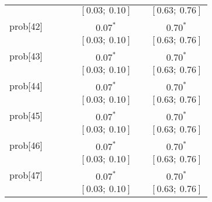 \begin{table}
\begin{center}
\begin{tabular}{l c c c c c c }
          &                           &                           &                           & $[0.03;\ 0.10]$         &                           & $[0.63;\ 0.76]$       \\
prob[42]  &                           &                           &                           & $0.07^{*}$              &                           & $0.70^{*}$            \\
          &                           &                           &                           & $[0.03;\ 0.10]$         &                           & $[0.63;\ 0.76]$       \\
prob[43]  &                           &                           &                           & $0.07^{*}$              &                           & $0.70^{*}$            \\
          &                           &                           &                           & $[0.03;\ 0.10]$         &                           & $[0.63;\ 0.76]$       \\
prob[44]  &                           &                           &                           & $0.07^{*}$              &                           & $0.70^{*}$            \\
          &                           &                           &                           & $[0.03;\ 0.10]$         &                           & $[0.63;\ 0.76]$       \\
prob[45]  &                           &                           &                           & $0.07^{*}$              &                           & $0.70^{*}$            \\
          &                           &                           &                           & $[0.03;\ 0.10]$         &                           & $[0.63;\ 0.76]$       \\
prob[46]  &                           &                           &                           & $0.07^{*}$              &                           & $0.70^{*}$            \\
          &                           &                           &                           & $[0.03;\ 0.10]$         &                           & $[0.63;\ 0.76]$       \\
prob[47]  &                           &                           &                           & $0.07^{*}$              &                           & $0.70^{*}$            \\
          &                           &                           &                           & $[0.03;\ 0.10]$         &                           & $[0.63;\ 0.76]$       \\

\end{tabular}
\end{center}
\end{table}
